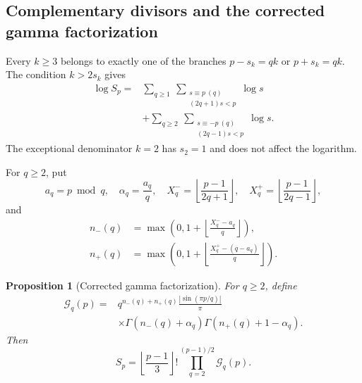 \documentclass[11pt]{amsart}
\numberwithin{equation}{section}
\newtheorem{proposition}[theorem]{Proposition}
\theoremstyle{definition}
\theoremstyle{remark}
\begin{document}
\subsection{Complementary divisors and the corrected gamma factorization}

Every \(k\ge3\) belongs to exactly one of the branches
\(p-s_k=qk\) or \(p+s_k=qk\).  The condition \(k>2s_k\) gives
\begin{equation}\label{eq:Sp-progression-log}
\begin{aligned}
 \log S_p
={}&\sum_{q\ge1}\ \sum_{\substack{s\equiv p\ (q)\\(2q+1)s<p}}\log s\\
&+\sum_{q\ge2}\ \sum_{\substack{s\equiv-p\ (q)\\(2q-1)s<p}}\log s.
\end{aligned}
\end{equation}
The exceptional denominator \(k=2\) has \(s_2=1\) and does not affect the
logarithm.

For \(q\ge2\), put
\begin{equation}\label{eq:gamma-parameters}
 a_q=p\bmod q,\quad \alpha_q=\frac{a_q}{q},\quad
 X_q^- =\left\lfloor\frac{p-1}{2q+1}\right\rfloor,\quad
 X_q^+ =\left\lfloor\frac{p-1}{2q-1}\right\rfloor,
\end{equation}
and
\begin{align}
 n_-(q)&=\max\left(0,1+\left\lfloor\frac{X_q^--a_q}{q}\right\rfloor\right),
 \label{eq:nminus}\\
 n_+(q)&=\max\left(0,1+\left\lfloor\frac{X_q^+-(q-a_q)}{q}\right\rfloor\right).
 \label{eq:nplus}
\end{align}

\begin{proposition}[Corrected gamma factorization]\label{prop:gamma-core}
For \(q\ge2\), define
\begin{equation}\label{eq:Gq-correct}
\begin{aligned}
 \mathcal G_q(p)
={}&q^{n_-(q)+n_+(q)}\frac{|\sin(\pi p/q)|}{\pi}\\
&\times
 \Gamma\!\left(n_-(q)+\alpha_q\right)
 \Gamma\!\left(n_+(q)+1-\alpha_q\right).
\end{aligned}
\end{equation}
Then
\begin{equation}\label{eq:Sp-gamma}
 S_p=\left\lfloor\frac{p-1}{3}\right\rfloor!
 \prod_{q=2}^{(p-1)/2}\mathcal G_q(p).
\end{equation}
\end{proposition}
\end{document}
